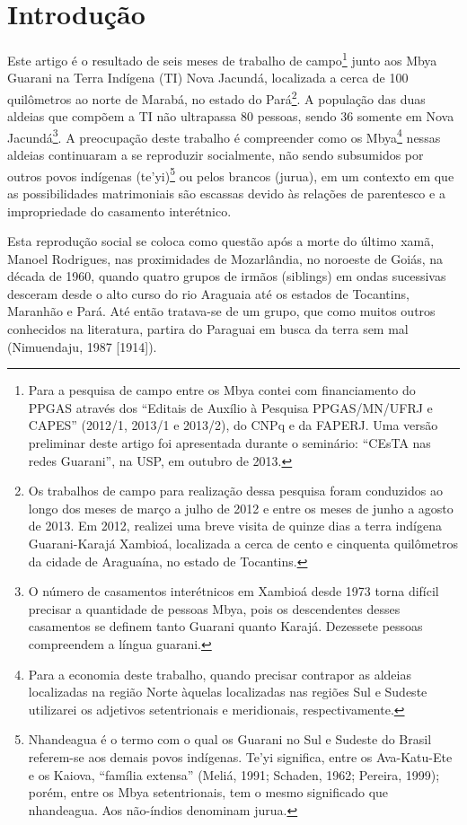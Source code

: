 \section{Introdução}

Este artigo é o resultado de seis meses de trabalho de
campo\footnote{Para a pesquisa de campo entre os Mbya contei com
financiamento do PPGAS através dos ``Editais de Auxílio à Pesquisa
PPGAS/MN/UFRJ e CAPES'' (2012/1, 2013/1 e 2013/2), do CNPq e da FAPERJ.
Uma versão preliminar deste artigo foi apresentada durante o seminário:
``CEsTA nas redes Guarani'', na USP, em outubro de 2013.} junto aos Mbya
Guarani na Terra Indígena (TI) Nova Jacundá, localizada a cerca de 100
quilômetros ao norte de Marabá, no estado do Pará\footnote{Os trabalhos
de campo para realização dessa pesquisa foram conduzidos ao longo dos
meses de março a julho de 2012 e entre os meses de junho a agosto de
2013. Em 2012, realizei uma breve visita de quinze dias a terra
indígena Guarani-Karajá Xambioá, localizada a cerca de cento e
cinquenta quilômetros da cidade de Araguaína, no estado de Tocantins.}.
A população das duas aldeias que compõem a TI não ultrapassa 80
pessoas, sendo 36 somente em Nova Jacundá\footnote{O número de
casamentos interétnicos em Xambioá desde 1973 torna difícil precisar a
quantidade de pessoas Mbya, pois os descendentes desses casamentos se
definem tanto Guarani quanto Karajá. Dezessete pessoas compreendem a
língua guarani.}. A preocupação deste trabalho é compreender como os
Mbya\footnote{Para a economia deste trabalho, quando precisar contrapor
as aldeias localizadas na região Norte àquelas localizadas nas regiões
Sul e Sudeste utilizarei os adjetivos setentrionais e meridionais,
respectivamente.} nessas aldeias continuaram a se reproduzir
socialmente, não sendo subsumidos por outros povos indígenas
(te’yi)\footnote{Nhandeagua é o termo com o qual os Guarani no Sul e
Sudeste do Brasil referem-se aos demais povos indígenas. Te’yi
significa, entre os Ava-Katu-Ete e os Kaiova, ``família extensa'' (Meliá,
1991; Schaden, 1962; Pereira, 1999); porém, entre os Mbya setentrionais,
tem o mesmo significado que nhandeagua. Aos não-índios denominam
jurua.} ou pelos brancos (jurua), em um contexto em que as
possibilidades matrimoniais são escassas devido às relações de
parentesco e a impropriedade do casamento interétnico.

Esta reprodução social se coloca como questão após a morte do último
xamã, Manoel Rodrigues, nas proximidades de Mozarlândia, no noroeste de
Goiás, na década de 1960, quando quatro grupos de irmãos (siblings) em
ondas sucessivas desceram desde o alto curso do rio Araguaia até os
estados de Tocantins, Maranhão e Pará. Até então tratava-se de um
grupo, que como muitos outros conhecidos na literatura, partira do
Paraguai em busca da terra sem mal (Nimuendaju, 1987 [1914]).

